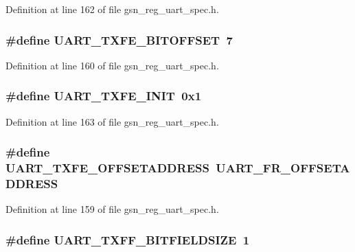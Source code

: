Definition at line 162 of file gsn\_\-reg\_\-uart\_\-spec.h.

\hypertarget{a00575_a01a0be69fed99db0cdbe23e62605e7e4}{
\subsubsection[{UART\_\-TXFE\_\-BITOFFSET}]{\setlength{\rightskip}{0pt plus 5cm}\#define UART\_\-TXFE\_\-BITOFFSET~7}}
\label{a00575_a01a0be69fed99db0cdbe23e62605e7e4}


Definition at line 160 of file gsn\_\-reg\_\-uart\_\-spec.h.

\hypertarget{a00575_a85598fcf9b8de6fd923107985ac1b7e2}{
\subsubsection[{UART\_\-TXFE\_\-INIT}]{\setlength{\rightskip}{0pt plus 5cm}\#define UART\_\-TXFE\_\-INIT~0x1}}
\label{a00575_a85598fcf9b8de6fd923107985ac1b7e2}


Definition at line 163 of file gsn\_\-reg\_\-uart\_\-spec.h.

\hypertarget{a00575_a3472eaebc0f1cd3d038f35aa27f2dcbf}{
\subsubsection[{UART\_\-TXFE\_\-OFFSETADDRESS}]{\setlength{\rightskip}{0pt plus 5cm}\#define UART\_\-TXFE\_\-OFFSETADDRESS~UART\_\-FR\_\-OFFSETADDRESS}}
\label{a00575_a3472eaebc0f1cd3d038f35aa27f2dcbf}


Definition at line 159 of file gsn\_\-reg\_\-uart\_\-spec.h.

\hypertarget{a00575_a3014fc1345130c3984ae949886447314}{
\subsubsection[{UART\_\-TXFF\_\-BITFIELDSIZE}]{\setlength{\rightskip}{0pt plus 5cm}\#define UART\_\-TXFF\_\-BITFIELDSIZE~1}}
\label{a00575_a3014fc1345130c3984ae949886447314}


